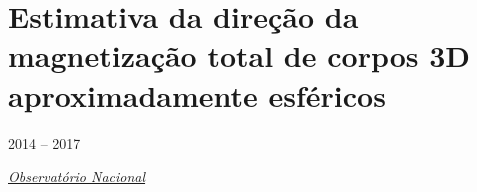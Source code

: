 %
%
%
%
%
%

\clearpage

\section{Estimativa da direção da magnetização total de corpos 3D aproximadamente esféricos}
\label{sec:projeto-Daiana}

2014 -- 2017
\vspace{0.3\baselineskip}\\
\noindent\parbox{0.03\textwidth}{\vspace{-0.2\baselineskip}\faUniversity}
\href{https://www.gov.br/observatorio/pt-br}{\textsl{Observatório Nacional}}
\parbox{0.03\textwidth}{\vspace{-0.2\baselineskip} \hfill {}} 


